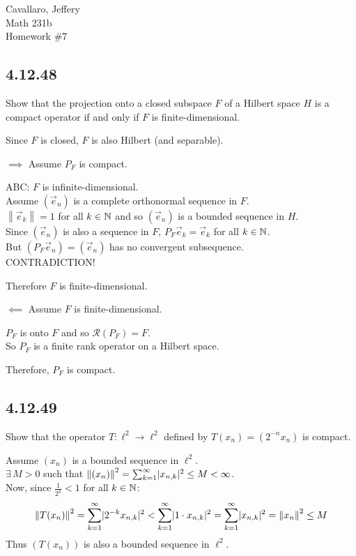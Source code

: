 \documentclass[letterpaper,12pt,fleqn]{article}
\newcommand{\ve}{\vec{e}}
\newcommand{\norm}[1]{\left\|#1\right\|}
\newcommand{\mr}{\mathcal{R}}
\begin{document}
Cavallaro, Jeffery \\
Math 231b \\
Homework \#7

\subsection*{4.12.48}

Show that the projection onto a closed subspace $F$ of a Hilbert space $H$ is
a compact operator if and only if $F$ is finite-dimensional.

Since $F$ is closed, $F$ is also Hilbert (and separable).
\begin{description}
\item $\implies$ Assume $P_F$ is compact.

  ABC: $F$ is infinite-dimensional. \\
  Assume $(\ve_n)$ is a complete orthonormal sequence in $F$. \\
  $\norm{\ve_k}=1$ for all $k\in\mathbb{N}$ and so $(\ve_n)$ is a bounded sequence in
  $H$. \\
  Since $(\ve_n)$ is also a sequence in $F$, $P_F\ve_k=\ve_k$ for all
  $k\in\mathbb{N}$. \\
  But $(P_F\ve_n)=(\ve_n)$ has no convergent subsequence. \\
  CONTRADICTION!

  Therefore $F$ is finite-dimensional.

\item $\impliedby$ Assume $F$ is finite-dimensional.

  $P_F$ is onto $F$ and so $\mr(P_F)=F$. \\
  So $P_F$ is a finite rank operator on a Hilbert space.

  Therefore, $P_F$ is compact.
\end{description}

\subsection*{4.12.49}

Show that the operator $T:\ell^2\to\ell^2$ defined by $T(x_n)=(2^{-n}x_n)$
is compact.

Assume $(x_n)$ is a bounded sequence in $\ell^2$. \\
$\exists\,M>0$ such that
$\norm{(x_n)}^2=\sum_{k=1}^{\infty}\abs{x_{n,k}}^2\le M<\infty$. \\
Now, since $\frac{1}{2^k}<1$ for all $k\in\mathbb{N}$:
\[\norm{T(x_n)}^2=\sum_{k=1}^{\infty}\abs{2^{-k}x_{n,k}}^2<
\sum_{k=1}^{\infty}\abs{1\cdot x_{n,k}}^2=
\sum_{k=1}^{\infty}\abs{x_{n,k}}^2=\norm{x_n}^2\le M\]
Thus $(T(x_n))$ is also a bounded sequence in $\ell^2$. \\
\end{document}
